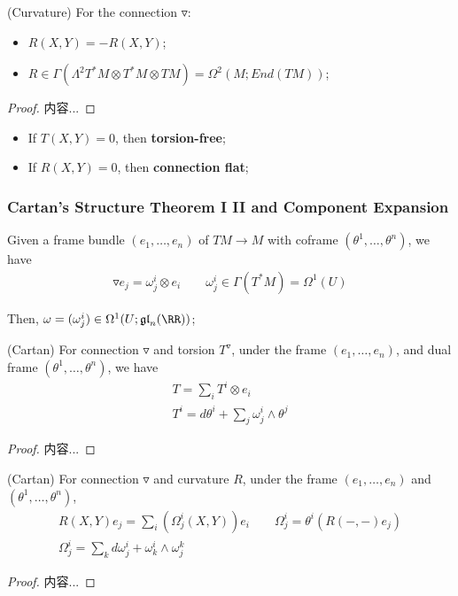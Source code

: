 \documentclass[Total.tex]{subfiles}
\begin{document}
		\begin{proposition}
			(Curvature) For the connection $\triangledown$:
			\begin{itemize}
				\item $R(X,Y)=-R(X,Y)$;
				\item $R\in \Gamma(\Lambda^2 T^*M\otimes T^* M\otimes TM)=\Omega^2(M;End(TM))$;
			\end{itemize}
		\end{proposition}
		\begin{proof}
			内容...
		\end{proof}
		
		\begin{Def}
			\begin{itemize}
				\item If $T(X,Y)=0$, then \textbf{torsion-free};
				\item If $R(X,Y)=0$, then \textbf{connection flat};
			\end{itemize}
		\end{Def}
		\subsubsection{Cartan's Structure Theorem I II and Component Expansion}
			\begin{Def}
				Given a frame bundle $(e_1,\dots,e_n)$ of $TM\rightarrow M$ with coframe $(\theta^1,\dots,\theta^n)$, we have 
				\begin{gather*}
					\triangledown e_j=\omega^i_j\otimes e_i\qquad \omega^i_j\in \Gamma(T^*M)=\Omega^1(U)
				\end{gather*}
				
				Then, $\omega=(\omega^i_j)\in \Omega^1(U;\mathfrak{gl}_n(\RR))$;
			\end{Def}
				\begin{theorem}
					(Cartan) For connection $\triangledown$ and torsion $T^\triangledown$, under the frame $(e_1,\dots,e_n)$, and dual frame $(\theta^1,\dots,\theta^n)$, we have
					\begin{gather*}
						T=\sum_i T^i\otimes e_i\\
						T^i=d\theta^i+\sum_j \omega^i_j\wedge \theta^j
					\end{gather*}
				\end{theorem}
				\begin{proof}
					内容...
				\end{proof}
				\begin{theorem}
					(Cartan) For connection $\triangledown$ and curvature $R$, under the frame $(e_1,\dots,e_n)$ and $(\theta^1,\dots,\theta^n)$,
					\begin{gather*}
						R(X,Y)e_j=\sum_i (\Omega^i_j (X,Y))e_i\qquad \Omega^i_j=\theta^i(R(-,-)e_j)\\
						\Omega^i_j=\sum_k d\omega^i_j+\omega^i_k\wedge \omega^k_j
					\end{gather*}
				\end{theorem}
				\begin{proof}
					内容...
				\end{proof}
\end{document}
